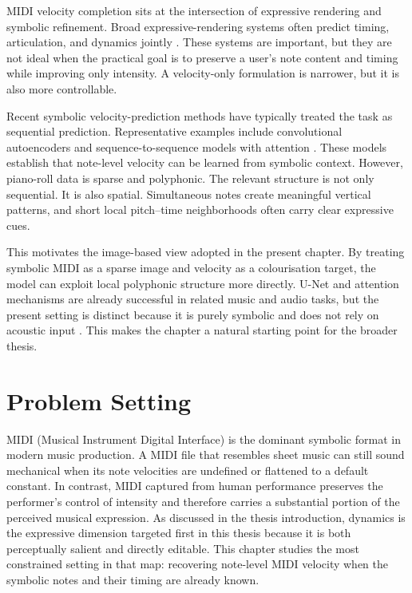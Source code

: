 MIDI velocity completion sits at the intersection of expressive rendering and symbolic refinement. Broad expressive-rendering systems often predict timing, articulation, and dynamics jointly \cite{jeong2019virtuosonet,borovik2023scoreperformer}. These systems are important, but they are not ideal when the practical goal is to preserve a user's note content and timing while improving only intensity. A velocity-only formulation is narrower, but it is also more controllable.

Recent symbolic velocity-prediction methods have typically treated the task as sequential prediction. Representative examples include convolutional autoencoders and sequence-to-sequence models with attention \cite{kuo2021velocity,kim2023piano}. These models establish that note-level velocity can be learned from symbolic context. However, piano-roll data is sparse and polyphonic. The relevant structure is not only sequential. It is also spatial. Simultaneous notes create meaningful vertical patterns, and short local pitch--time neighborhoods often carry clear expressive cues.

This motivates the image-based view adopted in the present chapter. By treating symbolic MIDI as a sparse image and velocity as a colourisation target, the model can exploit local polyphonic structure more directly. U-Net and attention mechanisms are already successful in related music and audio tasks, but the present setting is distinct because it is purely symbolic and does not rely on acoustic input \cite{he2025filling,kim2024method}. This makes the chapter a natural starting point for the broader thesis.

\section{Problem Setting}
\label{sec:velcomp:problem}

MIDI (Musical Instrument Digital Interface) is the dominant symbolic format in modern music production. A MIDI file that resembles sheet music can still sound mechanical when its note velocities are undefined or flattened to a default constant. In contrast, MIDI captured from human performance preserves the performer's control of intensity and therefore carries a substantial portion of the perceived musical expression. As discussed in the thesis introduction, dynamics is the expressive dimension targeted first in this thesis because it is both perceptually salient and directly editable. This chapter studies the most constrained setting in that map: recovering note-level MIDI velocity when the symbolic notes and their timing are already known.

